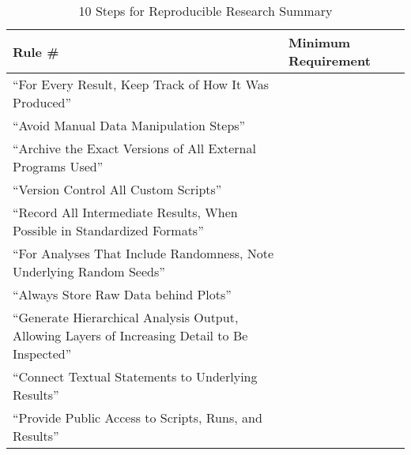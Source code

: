 \begin{table}[ht!]
    \small
    \caption{10 Steps for Reproducible Research Summary}
    \label{reproducible}
    \begin{adjustbox}{center}
        \renewcommand*\arraystretch{1}\begin{tabular}{| L{6cm} | L{7cm} |}
            \hline
            \textbf{Rule \#} & \textbf{Minimum Requirement}
            \\ \hline
            ``For Every Result, Keep Track of How It Was Produced''&
            \\ \hline
            ``Avoid Manual Data Manipulation Steps''&
            \\ \hline
            ``Archive the Exact Versions of All External Programs Used''&
            \\ \hline
            ``Version Control All Custom Scripts''&
            \\ \hline
            ``Record All Intermediate Results, When Possible in Standardized Formats''&
            \\ \hline
            ``For Analyses That Include Randomness, Note Underlying Random Seeds''&
            \\ \hline
            ``Always Store Raw Data behind Plots''&
            \\ \hline
            ``Generate Hierarchical Analysis Output, Allowing Layers of Increasing Detail to Be Inspected''&
            \\ \hline
            ``Connect Textual Statements to Underlying Results''&
            \\ \hline
            ``Provide Public Access to Scripts, Runs, and Results''&
            \\ \hline
        \end{tabular}
    \end{adjustbox}
\end{table}
